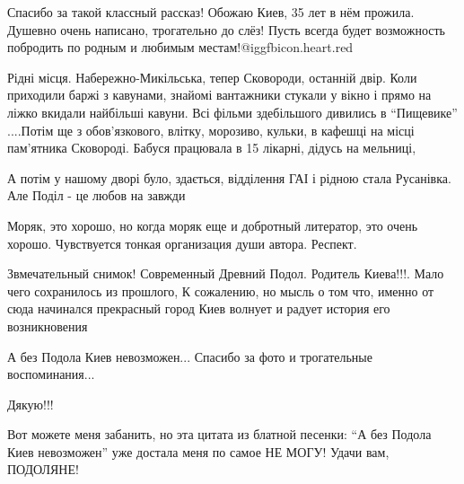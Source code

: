 \begin{itemize}

Спасибо за такой классный рассказ! Обожаю Киев, 35 лет в нём прожила. Душевно
очень написано, трогательно до слёз! Пусть всегда будет возможность побродить
по родным и любимым местам!@igg{fbicon.heart.red}


Рідні місця. Набережно-Микільська, тепер Сковороди, останній двір. Коли
приходили баржі з кавунами, знайомі вантажники стукали у вікно і прямо на ліжко
вкидали найбільші кавуни. Всі фільми здебільшого дивились в \enquote{Пищевике} ....Потім
ще з обов'язкового, влітку, морозиво, кульки, в кафешці на місці пам'ятника
Сковороді. Бабуся працювала в 15 лікарні, дідусь на мельниці,

А потім у нашому дворі було, здається, відділення ГАІ і рідною стала Русанівка.
Але Поділ - це любов на завжди


Моряк, это хорошо, но когда моряк еще и добротный литератор, это очень хорошо.
Чувствуется тонкая организация души автора. Респект.


Звмечательный снимок! Современный Древний Подол.  Родитель Киева!!!. Мало чего
сохранилось из прошлого, К сожалению, но мысль о том что, именно от сюда
начинался прекрасный город Киев волнует и радует история его возникновения


А без Подола Киев невозможен... Спасибо за фото и трогательные воспоминания...

Дякую!!!


Вот можете меня забанить, но эта цитата из блатной песенки: \enquote{А без Подола Киев
невозможен} уже достала меня по самое НЕ МОГУ! Удачи вам, ПОДОЛЯНЕ!


\end{itemize} %
